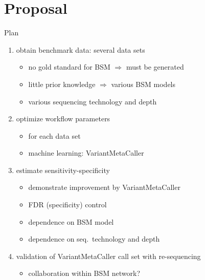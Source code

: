 \documentclass{beamer}
\begin{document}
\section{Proposal}

\begin{frame}{Plan}
\begin{enumerate}
\item<1> obtain benchmark data: several data sets
\begin{itemize}
\item no gold standard for BSM \(\Rightarrow\) must be generated
\item little prior knowledge \(\Rightarrow\) various BSM models
\item various sequencing technology and depth 
\end{itemize}
\item<2> optimize workflow parameters
\begin{itemize}
\item for each data set
\item machine learning: VariantMetaCaller 
\end{itemize}
\item<3> estimate sensitivity-specificity 
\begin{itemize}
\item demonstrate improvement by VariantMetaCaller
\item FDR (specificity) control
\item dependence on BSM model
\item dependence on seq.~technology and depth
\end{itemize}
\item validation of VariantMetaCaller call set with re-sequencing
\begin{itemize}
\item<4> collaboration within BSM network?
\end{itemize}
\end{enumerate}
\end{frame}
\end{document}
